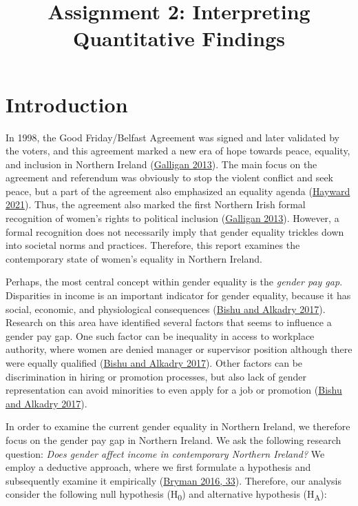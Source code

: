 \documentclass[
]{article}
\title{Assignment 2: Interpreting Quantitative Findings}
\subtitle{\hfill\break
University of Glasgow\\
\strut \\
Student ID: 2819052\\
Course: Quantitative Methods in the Social Sciences\\
Number of words: 2747\\}
\author{}
\date{\vspace{-2.5em}}
\begin{document}
\maketitle

\pagebreak

\setcounter{tocdepth}{2}
\tableofcontents

\pagebreak

\hypertarget{introduction}{%
\section{Introduction}\label{introduction}}

\doublespacing 

In 1998, the Good Friday/Belfast Agreement was signed and later
validated by the voters, and this agreement marked a new era of hope
towards peace, equality, and inclusion in Northern Ireland
(\protect\hyperlink{ref-galligan2013gender}{Galligan 2013}). The main
focus on the agreement and referendum was obviously to stop the violent
conflict and seek peace, but a part of the agreement also emphasized an
equality agenda (\protect\hyperlink{ref-Hayward2021}{Hayward 2021}).
Thus, the agreement also marked the first Northern Irish formal
recognition of women's rights to political inclusion
(\protect\hyperlink{ref-galligan2013gender}{Galligan 2013}). However, a
formal recognition does not necessarily imply that gender equality
trickles down into societal norms and practices. Therefore, this report
examines the contemporary state of women's equality in Northern Ireland.

Perhaps, the most central concept within gender equality is the
\emph{gender pay gap}. Disparities in income is an important indicator
for gender equality, because it has social, economic, and physiological
consequences (\protect\hyperlink{ref-bishu2017gender}{Bishu and Alkadry
2017}). Research on this area have identified several factors that seems
to influence a gender pay gap. One such factor can be inequality in
access to workplace authority, where women are denied manager or
supervisor position although there were equally qualified
(\protect\hyperlink{ref-bishu2017gender}{Bishu and Alkadry 2017}). Other
factors can be discrimination in hiring or promotion processes, but also
lack of gender representation can avoid minorities to even apply for a
job or promotion (\protect\hyperlink{ref-bishu2017gender}{Bishu and
Alkadry 2017}).

In order to examine the current gender equality in Northern Ireland, we
therefore focus on the gender pay gap in Northern Ireland. We ask the
following research question: \emph{Does gender affect income in
contemporary Northern Ireland?} We employ a deductive approach, where we
first formulate a hypothesis and subsequently examine it empirically
(\protect\hyperlink{ref-bryman2016social}{Bryman 2016, 33}). Therefore,
our analysis consider the following null hypothesis (H\textsubscript{0})
and alternative hypothesis (H\textsubscript{A}):
\end{document}
